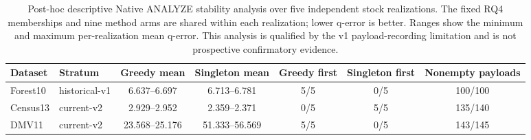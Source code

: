 \begin{table}[t]
\centering
\caption{Post-hoc descriptive Native ANALYZE stability analysis over five independent stock realizations. The fixed RQ4 memberships and nine method arms are shared within each realization; lower q-error is better. Ranges show the minimum and maximum per-realization mean q-error. This analysis is qualified by the v1 payload-recording limitation and is not prospective confirmatory evidence.}
\label{tab:native-analyze-stability-v2}
\small
\begin{tabular}{l l c c c c c}
\toprule
Dataset & Stratum & Greedy mean & Singleton mean & Greedy first & Singleton first & Nonempty payloads \\
\midrule
Forest10 & historical-v1 & 6.637--6.697 & 6.713--6.781 & 5/5 & 0/5 & 100/100 \\
Census13 & current-v2 & 2.929--2.952 & 2.359--2.371 & 0/5 & 5/5 & 135/140 \\
DMV11 & current-v2 & 23.568--25.176 & 51.333--56.569 & 5/5 & 0/5 & 143/145 \\
\bottomrule
\end{tabular}
\end{table}
